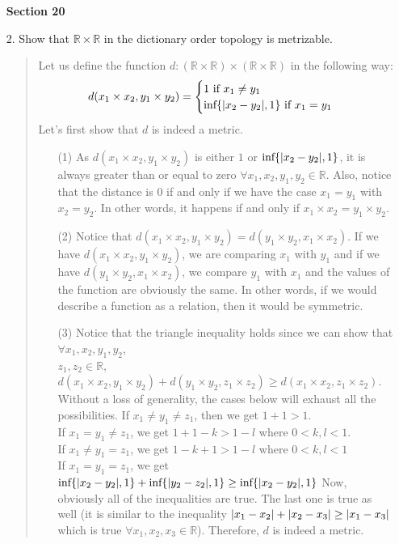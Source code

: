 \documentclass[12pt, a4paper]{article}
\newcommand{\reals}{\mathbb{R}} %
\DeclarePairedDelimiter\abs{\lvert}{\rvert}
\begin{document}
\begin{itemize}
\item[]
\item[]
\item[]
{\large \textbf{Section 20}}
\vspace{0.3cm}

\item[2.]
Show that $\reals \times \reals$ in the dictionary order topology is metrizable.
\begin{quote}
Let us define the function $d : (\reals \times \reals) \times (\reals \times \reals)$
in the following way:
$$
d(x_1 \times x_2, y_1 \times y_2) = 
\begin{cases}
1 \mbox{ if } x_1 \neq y_1\\
\mbox{inf}\{\abs{x_2 - y_2}, 1\} \mbox{ if } x_1 = y_1
\end{cases}
$$
Let's first show that $d$ is indeed a metric.
\begin{itemize}
\item[(1)]
As $d(x_1 \times x_2, y_1 \times y_2)$ is either $1$ or $\mbox{inf}\{\abs{x_2 - y_2}, 1\}$,
it is always greater than or equal to zero $\forall x_1, x_2, y_1, y_2 \in \reals$.
Also, notice that the distance is $0$ if and only if we have the case $x_1 = y_1$ with
$x_2 = y_2$. In other words, it happens if and only if $x_1 \times x_2 = y_1 \times y_2$.

\item[(2)]
Notice that $d(x_1 \times x_2, y_1 \times y_2) = d(y_1 \times y_2, x_1 \times x_2)$.
If we have $d(x_1 \times x_2, y_1 \times y_2)$, we are comparing $x_1$ with $y_1$
and if we have $d(y_1 \times y_2, x_1 \times x_2)$, we compare $y_1$ with $x_1$ and
the values of the function are obviously the same. In other words, if we would describe
a function as a relation, then it would be symmetric.

\item[(3)]
Notice that the triangle inequality holds since we can show that $\forall x_1, x_2, y_1, y_2$,\\
$z_1, z_2 \in \reals$, $d(x_1 \times x_2, y_1 \times y_2) + d(y_1 \times y_2, z_1 \times z_2) \geq d(x_1 \times x_2, z_1 \times z_2)$.
Without a loss of generality, the cases below will exhaust all the possibilities.
\newline
\newline
If $x_1 \neq y_1 \neq z_1$, then we get $1 + 1 > 1$.\\
If $x_1 = y_1 \neq z_1$, we get $1 + 1 - k > 1 - l$ where $0 < k, l < 1$.\\
If $x_1 \neq y_1 = z_1$, we get $1 - k + 1 > 1 - l$ where $0 < k, l < 1$\\
If $x_1 = y_1 = z_1$, we get $\mbox{inf}\{\abs{x_2 - y_2}, 1\} + \mbox{inf}\{\abs{y_2 - z_2}, 1\} \geq \mbox{inf}\{\abs{x_2 - y_2}, 1\}$
\newline
\newline
Now, obviously all of the inequalities are true. The last one is true as well (it is similar to the inequality $\abs{x_1 - x_2} + \abs{x_2 - x_3} \geq \abs{x_1 - x_3}$
which is true $\forall x_1, x_2, x_3 \in \reals$). Therefore, $d$ is indeed a metric.
\end{itemize}


\end{quote}
\end{itemize}
\end{document}
